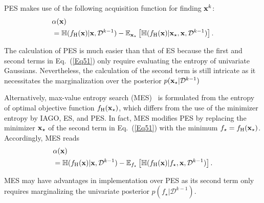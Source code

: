 \documentclass[iicol,sn-basic]{sn-jnl}%
\theoremstyle{thmstyleone}%
\theoremstyle{thmstyletwo}
\theoremstyle{thmstylethree}
\begin{document}
\begin{linenumbers}
PES makes use of the following acquisition function for finding ${\bf x}^k$:
\begin{equation}\label{Eq51}
	\begin{aligned}
		& \alpha({\bf x}) \\ 
		& = \mathbb{H}(f_\text{H}({\bf x})|{\bf x},\mathcal{D}^{k-1})-\mathbb{E}_{{\bf x}_\star}\left[\mathbb{H}(f_\text{H}({\bf x})|{\bf x}_\star,{\bf x},\mathcal{D}^{k-1})\right].
\end{aligned}
\end{equation}

The calculation of PES is much easier than that of ES because the first and second terms in Eq.~(\ref{Eq51}) only require evaluating the entropy of univariate Gaussians.
Nevertheless, the calculation of the second term is still intricate as it necessitates the marginalization over the posterior $p({\bf x}_\star|\mathcal{D}^{k-1})$

Alternatively, max-value entropy search (MES)~\citep{ZWang2017} is formulated from the entropy of optimal objective function $f_\text{H}({\bf x}_\star)$, which differs from the use of the minimizer entropy by IAGO, ES, and PES.
In fact, MES modifies PES by replacing the minimizer ${\bf x}_\star$ of the second term in Eq.~(\ref{Eq51}) with the minimum $f_\star = f_\text{H}({\bf x}_\star)$.
Accordingly, MES reads
\begin{equation}\label{Eq52}
	\begin{aligned}
	& \alpha({\bf x}) \\
	& = \mathbb{H}(f_\text{H}({\bf x})|{\bf x},\mathcal{D}^{k-1})-\mathbb{E}_{f_\star }\left[\mathbb{H}(f_\text{H}({\bf x})|f_\star ,{\bf x},\mathcal{D}^{k-1})\right].
	\end{aligned}
\end{equation}

MES may have advantages
in implementation over PES as its second term only requires marginalizing the univariate posterior $p(f_\star|\mathcal{D}^{k-1})$. 


\end{linenumbers}
\end{document}
